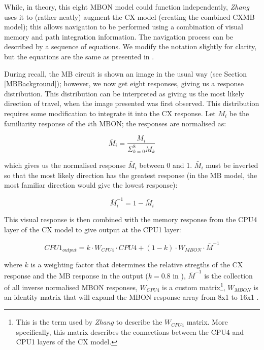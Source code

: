 \documentclass[a4paper,11pt,twoside,openright]{article}
\begin{document}
While, in theory, this eight MBON model could function independently,
\textit{Zhang} uses it to (rather neatly) augment the CX model
(creating the combined CXMB model); this allows navigation to be
performed using a combination of visual memory and path integration
information. The navigation process can be described by a sequence of
equations. We modify the notation slightly for clarity, but the
equations are the same as presented in \cite{Zhang2017}.
\newline
\par

During recall, the MB circuit is shown an image in the usual way (see
Section \ref{MBBackground}); however, we now get eight responses,
giving us a response distribution. This distribution can be
interpreted as giving us the most likely direction of travel, when the
image presented was first observed. This distribution requires some
modification to integrate it into the CX response. Let $M_i$ be the
familiarity response of the $i$th MBON; the responses are normalised
as:

\begin{equation}
  \bar{M}_i = \frac{M_i}{\Sigma^{8}_{k = 0} M_k}
\end{equation}

which gives us the normalised response $\bar{M}_i$ between 0 and 1. $\bar{M}_i$
must be inverted so that the most likely direction has the greatest response
(in the MB model, the most familiar direction would give the lowest response):

\begin{equation}
  \bar{M}^{-1}_i = 1 - \bar{M}_i
\end{equation}

This visual response is then combined with the memory response from the CPU4
layer of the CX model to give output at the CPU1 layer:

\begin{equation}
  CPU1_{output} = k \cdot W_{CPU4} \cdot CPU4 + (1 - k) \cdot W_{MBON} \cdot
  \bar{M}^{-1}
\end{equation}

where $k$ is a weighting factor that determines the relative stregths of the CX
response and the MB response in the output ($k = 0.8$ in \cite{Zhang2017}),
$\bar{M}^{-1}$ is the collection of all inverse normalised MBON responses,
$W_{CPU4}$ is a custom matrix\footnote{This is the term used by \textit{Zhang} to
  describe   the $W_{CPU4}$ matrix. More specifically, this matrix describes the
  connections between the CPU4 and CPU1 layers of the CX model.}, $W_{MBON}$ is
an identity matrix that will expand the MBON response array from 8x1 to 16x1
\cite{Zhang2017}.
\newline
\par
\end{document}
